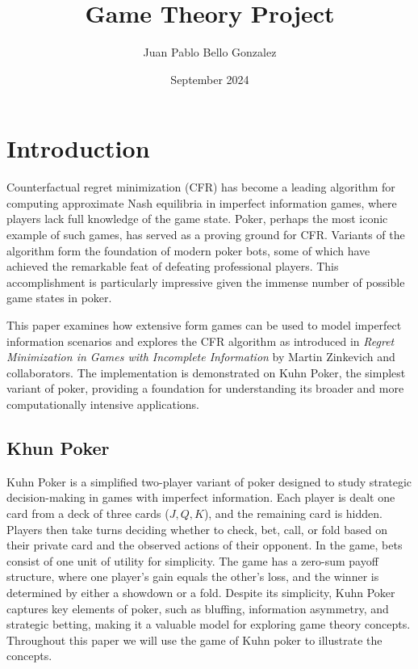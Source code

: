 \documentclass{article}
\title{Game Theory Project}
\author{Juan Pablo Bello Gonzalez}
\date{September 2024}
\begin{document}
\maketitle

\newpage




\section{Introduction}

Counterfactual regret minimization (CFR) has become a leading algorithm for computing approximate Nash equilibria in imperfect information games, where players lack full knowledge of the game state. Poker, perhaps the most iconic example of such games, has served as a proving ground for CFR. Variants of the algorithm form the foundation of modern poker bots, some of which have achieved the remarkable feat of defeating professional players. This accomplishment is particularly impressive given the immense number of possible game states in poker.  

This paper examines how extensive form games can be used to model imperfect information scenarios and explores the CFR algorithm as introduced in \textit{Regret Minimization in Games with Incomplete Information} by Martin Zinkevich and collaborators. The implementation is demonstrated on Kuhn Poker, the simplest variant of poker, providing a foundation for understanding its broader and more computationally intensive applications.


\subsection{Khun Poker}

Kuhn Poker is a simplified two-player variant of poker designed to study strategic decision-making in games with imperfect information. Each player is dealt one card from a deck of three cards (\(J, Q, K\)), and the remaining card is hidden. Players then take turns deciding whether to check, bet, call, or fold based on their private card and the observed actions of their opponent. In the game, bets consist of one unit of utility for simplicity. The game has a zero-sum payoff structure, where one player's gain equals the other's loss, and the winner is determined by either a showdown or a fold. Despite its simplicity, Kuhn Poker captures key elements of poker, such as bluffing, information asymmetry, and strategic betting, making it a valuable model for exploring game theory concepts. Throughout this paper we will use the game of Kuhn poker to illustrate the concepts. 
\end{document}
